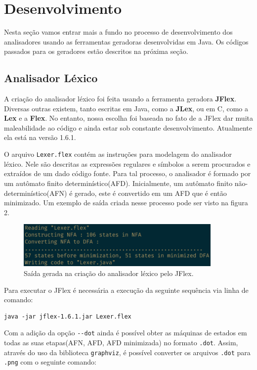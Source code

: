 \section{Desenvolvimento}
Nesta seção vamos entrar mais a fundo no processo de desenvolvimento dos analisadores usando as ferramentas geradoras desenvolvidas em Java. Os códigos passados para os geradores estão descritos na próxima seção.

\subsection{Analisador Léxico}
A criação do analisador léxico foi feita usando a ferramenta geradora \textbf{JFlex}\cite{klein_2017}. Diversas outras existem, tanto escritas em Java, como a \textbf{JLex}, ou em C, como a \textbf{Lex} e a \textbf{Flex}. No entanto, nossa escolha foi baseada no fato de a JFlex dar muita maleabilidade ao código e ainda estar sob constante desenvolvimento. Atualmente ela está na versão 1.6.1. 

O arquivo \texttt{Lexer.flex} contém as instruções para modelagem do analisador léxico. Nele são descritas as expressões regulares e símbolos a serem procurados e extraídos de um dado código fonte. Para tal processo, o analisador é formado por um autômato finito determinístico(AFD). Inicialmente, um autômato finito não-determinístico(AFN) é gerado, este é convertido em um AFD que é então minimizado. Um exemplo de saída criada nesse processo pode ser visto na figura 2.

\begin{figure}[h]	
 \centering
  \includegraphics[width=10cm,keepaspectratio]{images/lexer.png}
 \caption{Saída gerada na criação do analisador léxico pelo JFlex.}
\end{figure}

Para executar o JFlex é necessária a execução da seguinte sequência via linha de comando:

\begin{Verbatim}[frame=single]
java -jar jflex-1.6.1.jar Lexer.flex
\end{Verbatim}

Com a adição da opção \texttt{-{}-dot} ainda é possível obter as máquinas de estados em todas as suas etapas(AFN, AFD, AFD minimizada) no formato \texttt{.dot}. Assim, através do uso da biblioteca \texttt{graphviz}, é possível converter os arquivos \texttt{.dot} para \texttt{.png} com o seguinte comando:

